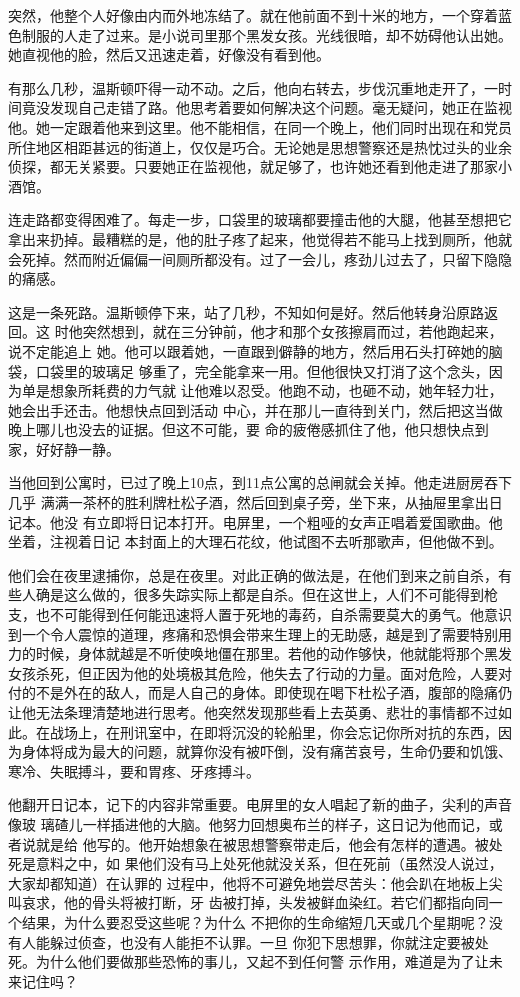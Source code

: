 突然，他整个人好像由内而外地冻结了。就在他前面不到十米的地方，一个穿着蓝色制服的人走了过来。是小说司里那个黑发女孩。光线很暗，却不妨碍他认出她。她直视他的脸，然后又迅速走着，好像没有看到他。

有那么几秒，温斯顿吓得一动不动。之后，他向右转去，步伐沉重地走开了，一时间竟没发现自己走错了路。他思考着要如何解决这个问题。毫无疑问，她正在监视他。她一定跟着他来到这里。他不能相信，在同一个晚上，他们同时出现在和党员所住地区相距甚远的街道上，仅仅是巧合。无论她是思想警察还是热忱过头的业余侦探，都无关紧要。只要她正在监视他，就足够了，也许她还看到他走进了那家小酒馆。

连走路都变得困难了。每走一步，口袋里的玻璃都要撞击他的大腿，他甚至想把它拿出来扔掉。最糟糕的是，他的肚子疼了起来，他觉得若不能马上找到厕所，他就会死掉。然而附近偏偏一间厕所都没有。过了一会儿，疼劲儿过去了，只留下隐隐的痛感。

这是一条死路。温斯顿停下来，站了几秒，不知如何是好。然后他转身沿原路返回。这
时他突然想到，就在三分钟前，他才和那个女孩擦肩而过，若他跑起来，说不定能追上
她。他可以跟着她，一直跟到僻静的地方，然后用石头打碎她的脑袋，口袋里的玻璃足
够重了，完全能拿来一用。但他很快又打消了这个念头，因为单是想象所耗费的力气就
让他难以忍受。他跑不动，也砸不动，她年轻力壮，她会出手还击。他想快点回到活动
中心，并在那儿一直待到关门，然后把这当做晚上哪儿也没去的证据。但这不可能，要
命的疲倦感抓住了他，他只想快点到家，好好静一静。

当他回到公寓时，已过了晚上10点，到11点公寓的总闸就会关掉。他走进厨房吞下几乎
满满一茶杯的胜利牌杜松子酒，然后回到桌子旁，坐下来，从抽屉里拿出日记本。他没
有立即将日记本打开。电屏里，一个粗哑的女声正唱着爱国歌曲。他坐着，注视着日记
本封面上的大理石花纹，他试图不去听那歌声，但他做不到。

他们会在夜里逮捕你，总是在夜里。对此正确的做法是，在他们到来之前自杀，有些人确是这么做的，很多失踪实际上都是自杀。但在这世上，人们不可能得到枪支，也不可能得到任何能迅速将人置于死地的毒药，自杀需要莫大的勇气。他意识到一个令人震惊的道理，疼痛和恐惧会带来生理上的无助感，越是到了需要特别用力的时候，身体就越是不听使唤地僵在那里。若他的动作够快，他就能将那个黑发女孩杀死，但正因为他的处境极其危险，他失去了行动的力量。面对危险，人要对付的不是外在的敌人，而是人自己的身体。即使现在喝下杜松子酒，腹部的隐痛仍让他无法条理清楚地进行思考。他突然发现那些看上去英勇、悲壮的事情都不过如此。在战场上，在刑讯室中，在即将沉没的轮船里，你会忘记你所对抗的东西，因为身体将成为最大的问题，就算你没有被吓倒，没有痛苦哀号，生命仍要和饥饿、寒冷、失眠搏斗，要和胃疼、牙疼搏斗。

他翻开日记本，记下的内容非常重要。电屏里的女人唱起了新的曲子，尖利的声音像玻
璃碴儿一样插进他的大脑。他努力回想奥布兰的样子，这日记为他而记，或者说就是给
他写的。他开始想象在被思想警察带走后，他会有怎样的遭遇。被处死是意料之中，如
果他们没有马上处死他就没关系，但在死前（虽然没人说过，大家却都知道）在认罪的
过程中，他将不可避免地尝尽苦头：他会趴在地板上尖叫哀求，他的骨头将被打断，牙
齿被打掉，头发被鲜血染红。若它们都指向同一个结果，为什么要忍受这些呢？为什么
不把你的生命缩短几天或几个星期呢？没有人能躲过侦查，也没有人能拒不认罪。一旦
你犯下思想罪，你就注定要被处死。为什么他们要做那些恐怖的事儿，又起不到任何警
示作用，难道是为了让未来记住吗？

